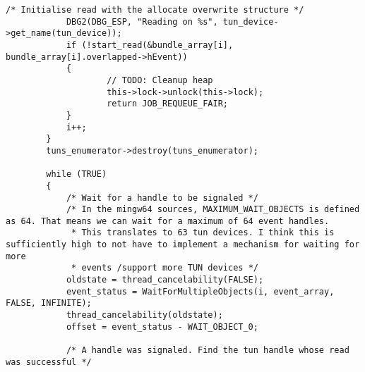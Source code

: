 \begin{lstlisting}[caption=Code für handle\_plain auf Windows,label=lst:handle-plain-windows]
            /* Initialise read with the allocate overwrite structure */
            DBG2(DBG_ESP, "Reading on %s", tun_device->get_name(tun_device));
            if (!start_read(&bundle_array[i], bundle_array[i].overlapped->hEvent))
            {
                    // TODO: Cleanup heap
                    this->lock->unlock(this->lock);
                    return JOB_REQUEUE_FAIR;
            }
            i++;
        }
        tuns_enumerator->destroy(tuns_enumerator);

        while (TRUE)
        {
            /* Wait for a handle to be signaled */
            /* In the mingw64 sources, MAXIMUM_WAIT_OBJECTS is defined as 64. That means we can wait for a maximum of 64 event handles.
             * This translates to 63 tun devices. I think this is sufficiently high to not have to implement a mechanism for waiting for more
             * events /support more TUN devices */
            oldstate = thread_cancelability(FALSE);
            event_status = WaitForMultipleObjects(i, event_array, FALSE, INFINITE);
            thread_cancelability(oldstate);
            offset = event_status - WAIT_OBJECT_0;

            /* A handle was signaled. Find the tun handle whose read was successful */


\end{lstlisting}
